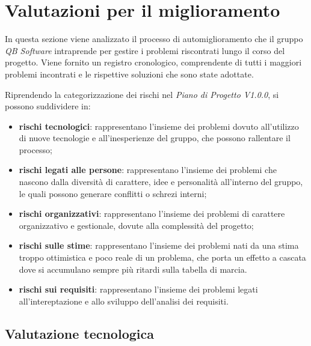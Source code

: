 \section{Valutazioni per il miglioramento} \label{valutazioni}
In questa sezione viene analizzato il processo di automiglioramento che il gruppo
\textit{QB Software} intraprende per gestire i problemi riscontrati lungo il corso del progetto.
Viene fornito un registro cronologico, comprendente di tutti i maggiori problemi incontrati
e le rispettive soluzioni che sono state adottate.

\noindent Riprendendo la categorizzazione dei rischi nel \textit{Piano di Progetto V1.0.0},
si possono suddividere in:

\begin{itemize}
    \item \textbf{rischi tecnologici}: rappresentano l'insieme dei problemi dovuto all'utilizzo di 
                nuove tecnologie e all'inesperienze del gruppo, che possono rallentare il processo;
    \item \textbf{rischi legati alle persone}: rappresentano l'insieme dei problemi che nascono dalla diversità di
                carattere, idee e personalità all'interno del gruppo, le quali possono generare conflitti o schrezi interni;
    \item  \textbf{rischi organizzativi}: rappresentano l'insieme dei problemi di carattere organizzativo
                e gestionale, dovute alla complessità del progetto;
    \item \textbf{rischi sulle stime}: rappresentano l'insieme dei problemi nati da una stima troppo ottimistica e poco reale di un problema,
                che porta un effetto a cascata dove si accumulano sempre più ritardi sulla tabella di marcia.
    \item \textbf{rischi sui requisiti}: rappresentano l'insieme dei problemi legati all'intereptazione 
    e allo sviluppo dell'analisi dei requisiti.
\end{itemize}


\subsection{Valutazione tecnologica}

